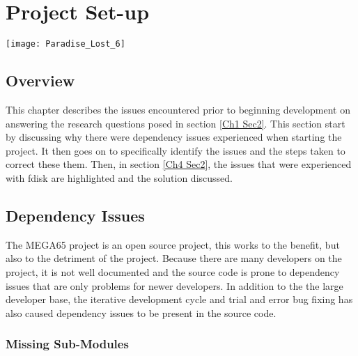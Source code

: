 
\chapter{Project Set-up} %

\label{Chapter 4} %

\texttt{[image: Paradise\_Lost\_6]}

\section{Overview}

This chapter describes the issues encountered prior to beginning development on answering the research questions posed in section \ref{Ch1 Sec2}. This section start by discussing why there were dependency issues experienced when starting the project. It then goes on to specifically identify the issues and the steps taken to correct these them. Then, in section \ref{Ch4 Sec2}, the issues that were experienced with fdisk are highlighted and the solution discussed. 


\section{Dependency Issues}

\label{Ch4 Sec1}

The MEGA65 project is an open source project, this works to the benefit, but also to the detriment of the project. Because there are many developers on the project, it is not well documented and the source code is prone to dependency issues that are only problems for newer developers. In addition to the the large developer base, the iterative development cycle and trial and error bug fixing has also caused dependency issues to be present in the source code.

\subsection{Missing Sub-Modules}

